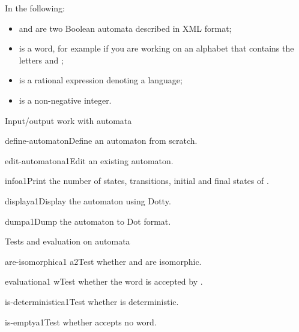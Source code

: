 In the following:
\begin{itemize}
\item {} and  are two Boolean automata described
  in \Vauc XML format;
\item {} is a word, for example  if you are
  working on an alphabet that contains the letters  and
  ;
\item {} is a rational expression denoting a language;
\item {} is a non-negative integer.
\end{itemize}


\begin{fnsection}{Input/output work with automata}
\item{define-automaton}{}{Define an automaton from scratch.}
\item{edit-automaton}{a1}{Edit an existing automaton.}
\item{info}{a1}{Print the number of states, transitions, initial and
    final states of .}
\item{display}{a1}{Display the automaton using Dotty.}
\item{dump}{a1}{Dump the automaton to Dot format.}  \hline
\end{fnsection}

\begin{fnsection}{Tests and evaluation on automata}
\item{are-isomorphic}{a1 a2}{Test whether  and  are
    isomorphic.}
\item{evaluation}{a1 w}{Test whether the word  is accepted by
    .}
\item{is-deterministic}{a1}{Test whether  is deterministic.}
\item{is-empty}{a1}{Test whether  accepts no word.}  \hline
\end{fnsection}

